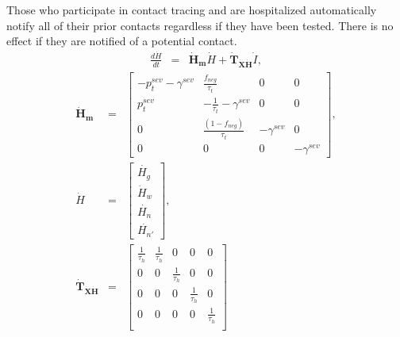 \documentclass[notitlepage, superscriptaddress]{revtex4-2}
\begin{document}
Those who participate in contact tracing and are hospitalized automatically notify all of their prior contacts regardless if they have been tested. There is no effect if they are notified of a potential contact.
\begin{eqnarray}
\frac{d\dot{H}}{dt} &=& \boldsymbol{\dot{H}_{m}}  \dot{H} + \boldsymbol{\dot{T}_{\dot{X}\dot{H}}}  \dot{I}, 
\end{eqnarray}
%
\begin{eqnarray}
\boldsymbol{\dot{H}_{m}} &=&
\begin{bmatrix}
 - p^{sev}_{t} - \gamma^{sev} & \frac{f_{neg}}{\tau_{t}}  & 0 & 0 \\
p^{sev}_{t}  & -\frac{1}{\tau_{t}} - \gamma^{sev}      &  0    & 0  \\
 0 & \frac{(1-f_{neg})}{\tau_{t}}  & - \gamma^{sev}  & 0 \\ 
0 & 0 & 0 & - \gamma^{sev}
\end{bmatrix}, \\ 
%
\dot{H} &=& 
\begin{bmatrix}
\dot{H_{g}} \\  \dot{H}_{w}\\ \dot{H_{n}} \\ \dot{H_{n'}}
\end{bmatrix}, \\ 
%
\boldsymbol{\dot{T}_{\dot{X}\dot{H}}} &=&
\begin{bmatrix}
\frac{1}{\tau_{h}}  & \frac{1}{\tau_{h}} & 0 & 0 & 0 \\ 
0          & 0                 &  \frac{1}{\tau_{h}} & 0 & 0 \\ 
0           & 0                 &  0 & \frac{1}{\tau_{h}} & 0 \\ 
 0       &  0  & 0 & 0 & \frac{1}{\tau_{h}} \\ 
\end{bmatrix}
\end{eqnarray}
% 
\end{document}
